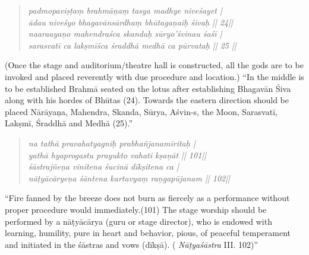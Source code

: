 \begin{verse}
\textit{padmopaviṣṭaṃ brahmāņaṃ tasya madhye niveśayet |}\\\textit{ādau niveśyo bhagavānsārdhaṃ bhūtagaņaiḥ śivaḥ || 24||}\\\textit{naaraayaņo mahendraśca skandaḥ sūryo’śvinau śaśī |}\\\textit{sarasvatī ca lakṣmīśca śraddhā medhā ca pūrvataḥ || 25 ||}
\end{verse}

(Once the stage and auditorium/theatre hall is constructed, all the gods are to be invoked and placed reverently with due procedure and location.) “In the middle is to be established Brahmā seated on the lotus after establishing Bhagavān Śiva along with his hordes of Bhūtas (24). Towards the eastern direction should be placed Nārāyaņa, Mahendra, Skanda, Sūrya, Aśvin-s, the Moon, Sarasvatī, Lakṣmī, Śraddhā and Medhā (25).”

\begin{verse}
\textit{na tathā pravahatyagniḥ prabhañjanamīritaḥ |}\\\textit{yathā hyaprogastu prayukto vahati kṣaņāt || 101||}\\\textit{śāstrajñeņa vinītena śucinā dīkṣitena ca | }\\\textit{nāṭyācāryeņa śāntena kartavyaṃ raņgapūjanam || 102||}
\end{verse}

“Fire fanned by the breeze does not burn as fiercely as a performance without proper procedure would immediately.(101) The stage worship should be performed by a nāṭyācārya (guru or stage director), who is endowed with learning, humility, pure in heart and behavior, pious, of peaceful temperament and initiated in the śāstras and vows (dīkṣā). ( \textit{Nāṭyaśāstra} III. 102)”

